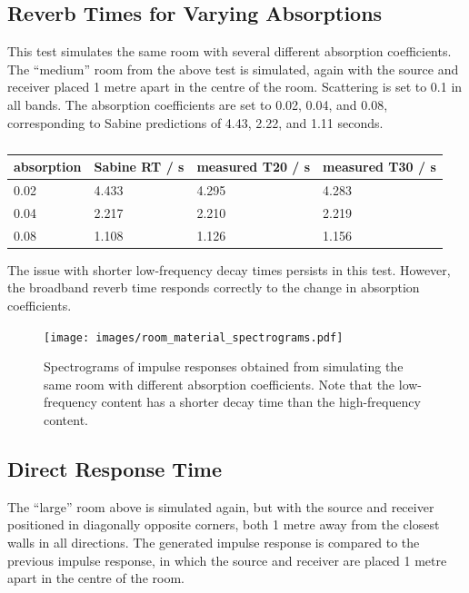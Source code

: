 \documentclass[]{scrreprt}
\begin{document}
\subsection{Reverb Times for Varying
Absorptions}\label{reverb-times-for-varying-absorptions}

This test simulates the same room with several different absorption
coefficients. The ``medium'' room from the above test is simulated,
again with the source and receiver placed 1 metre apart in the centre of
the room. Scattering is set to 0.1 in all bands. The absorption
coefficients are set to 0.02, 0.04, and 0.08, corresponding to Sabine
predictions of 4.43, 2.22, and 1.11 seconds.

\begin{table}[ht]
\centering

\caption{}

\begin{tabular}{@{}llll@{}}
\toprule

absorption & Sabine RT / s & measured T20 / s & measured T30 /
s \\\midrule

0.02 & 4.433 & 4.295 & 4.283 \\
0.04 & 2.217 & 2.210 & 2.219 \\
0.08 & 1.108 & 1.126 & 1.156 \\

\bottomrule
\end{tabular}

\end{table}

The issue with shorter low-frequency decay times persists in this test.
However, the broadband reverb time responds correctly to the change in
absorption coefficients.

\begin{figure}[htbp]
\centering
\texttt{[image: images/room\_material\_spectrograms.pdf]}
\caption{Spectrograms of impulse responses obtained from simulating the
same room with different absorption coefficients. Note that the
low-frequency content has a shorter decay time than the high-frequency
content.\label{fig:room_material_spectrograms}}
\end{figure}

\subsection{Direct Response Time}\label{direct-response-time}

The ``large'' room above is simulated again, but with the source and
receiver positioned in diagonally opposite corners, both 1 metre away
from the closest walls in all directions. The generated impulse response
is compared to the previous impulse response, in which the source and
receiver are placed 1 metre apart in the centre of the room.
\end{document}
